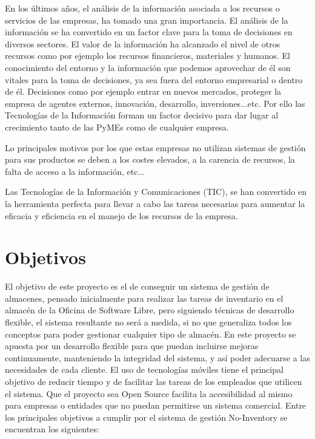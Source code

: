 \documentclass[a4paper,11pt]{book}
\begin{document}
En los últimos años, el análisis de la información asociada a los recursos o servicios de las empresas, ha tomado una gran importancia. El análisis de la información se ha convertido en un factor clave para la toma de decisiones en diversos sectores. El valor de la información ha alcanzado el nivel de otros recursos como por ejemplo los recursos financieros, materiales y humanos. El conocimiento del entorno y la información que podemos aprovechar de él son vitales para la toma de decisiones, ya sea fuera del entorno empresarial o dentro de él. Decisiones como por ejemplo entrar en nuevos mercados, proteger la empresa de agentes externos, innovación, desarrollo, inversiones...etc. Por ello las Tecnologías de la Información forman un factor decisivo para dar lugar al crecimiento tanto de las PyMEs como de cualquier empresa.

Lo principales motivos por los que estas empresas no utilizan sistemas de gestión para sus productos se deben a los costes elevados, a la carencia de recursos, la falta de acceso a la información, etc... 

Las Tecnologías de la Información y Comunicaciones (TIC), se han convertido en la herramienta perfecta para llevar a cabo las tareas necesarias para aumentar 
la eficacia y eficiencia en el manejo de los recursos de la empresa.



\section{Objetivos}

El objetivo de este proyecto es el de conseguir un sistema de gestión de almacenes, pensado inicialmente para realizar las tareas de inventario en el almacén de la Oficina de Software Libre, pero siguiendo técnicas de desarrollo flexible, el sistema resultante no será a medida, si no que generaliza todos los conceptos para poder gestionar cualquier tipo de almacén.  En este proyecto se apuesta por un desarrollo flexible para que puedan incluirse mejoras continuamente, manteniendo la integridad del sistema, y así poder adecuarse a las necesidades de cada cliente. El uso de tecnologías móviles tiene el principal objetivo de reducir tiempo y de facilitar las tareas de los empleados que utilicen el sistema. Que el proyecto sea Open Source facilita la accesibilidad al mismo para empresas o entidades que no puedan permitirse un sistema comercial. Entre los principales objetivos a cumplir por el sistema de gestión No-Inventory se encuentran los siguientes:
\end{document}
